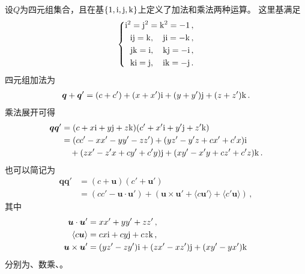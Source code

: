 设$Q$为四元组集合，且在基$\{1,{\rm i},{\rm j},{\rm k}\}$上定义了加法和乘法两种运算。
这里基满足
\begin{align}
    \left\{
    \begin{aligned}
        {\rm i}^2={\rm j}^2={\rm k}^2=-1\, ,         \\
        {\rm ij}={\rm k},\quad {\rm ji}={\rm -k}\, , \\
        {\rm jk}={\rm i},\quad {\rm kj}={\rm -i}\, , \\
        {\rm ki}={\rm j},\quad {\rm ik}={\rm -j}\, .
    \end{aligned}
    \right.
\end{align}
四元组加法为
\begin{align}
    {\bm q}+{\bm q}'=(c+c')+(x+x'){\rm i}+(y+y'){\rm j}+(z+z'){\rm k}\, .
\end{align}
乘法展开可得
\begin{align}
    {\bm q}{\bm q}' & =(c+x{\rm i}+y{\rm j}+z{\rm k})(c'+x'{\rm i}+y'{\rm j}+z'{\rm k})\nonumber \\
                    & =(cc'-xx'-yy'-zz')+(yz'-y'z+cx'+c'x){\rm i}\nonumber                       \\
                    & \quad+(zx'-z'x+cy'+c'y){\rm j}+(xy'-x'y+cz'+c'z){\rm k}\, .
\end{align}
也可以简记为
\begin{align}
    {\bm q}{\bm q}' & =(c+{\bm u})(c'+{\bm u}')\nonumber                                                                        \\
                    & =(cc'-{\bm u}\cdot{\bm u}')+({\bm u}\times{\bm u}'+\langle c{\bm u}'\rangle+\langle c'{\bm u}\rangle)\, ,
\end{align}
其中
\begin{align*}
    {\bm u}\cdot{\bm u}'    & =xx'+yy'+zz'\, ,                                      \\
    \langle c{\bm u}\rangle & =cx{\rm i}+cy{\rm j}+cz{\rm k}\, ,                    \\
    {\bm u}\times{\bm u}'   & =(yz'-zy'){\rm i}+(zx'-xz'){\rm j}+(xy'-yx'){\rm k}\,
\end{align*}
分别为、数乘、。